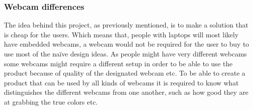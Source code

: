 \subsubsection{Webcam differences}
The idea behind this project, as previously mentioned, is to make a solution that is cheap for the users. Which means that, people with laptops will most likely have embedded webcams, a webcam would not be required for the user to buy to use most of the naïve design ideas. As people might have very different webcams some webcams might require a different setup in order to be able to use the product because of quality of the designated webcam etc. To be able to create a product that can be used by all kinds of webcams it is required to know what distinguishes the different webcams from one another, such as how good they are at grabbing the true colors etc.